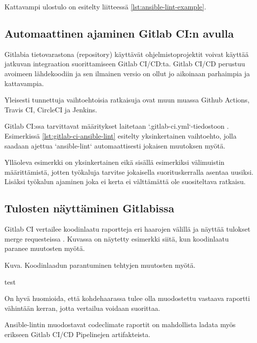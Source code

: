 Kattavampi ulostulo on esitelty liitteessä \ref{lst:ansible-lint-example}.

\subsection{Automaattinen ajaminen Gitlab CI:n avulla}

Gitlabia tietovarastona (repository) käyttävät ohjelmistoprojektit voivat käyttää
jatkuvan integraation suorittamiseen Gitlab CI/CD:ta. Gitlab CI/CD perustuu
avoimeen lähdekoodiin ja sen ilmainen versio on ollut jo aikoinaan parhaimpia ja
kattavampia. \parencite{alma9911268330505973}

Yleisesti tunnettuja vaihtoehtoisia ratkaisuja ovat muun muassa Github Actions,
Travis CI, CircleCI ja Jenkins.

Gitlab CI:ssa tarvittavat määritykset laitetaan `.gitlab-ci.yml`-tiedostoon
\parencite{GitlabCICDDocs}. Esimerkissä \ref{lst:gitlab-ci-ansible-lint} esitelty
yksinkertainen vaihtoehto, jolla saadaan ajettua `ansible-lint` automaattisesti
jokaisen muutoksen myötä.



Ylläoleva esimerkki on yksinkertainen eikä sisällä esimerkiksi välimuistin
määrittämistä, jotten työkaluja tarvitse jokaisella suorituskerralla asentaa
uusiksi. Lisäksi työkalun ajaminen joka ei kerta ei välttämättä ole suositeltava
ratkaisu.

\subsection{Tulosten näyttäminen Gitlabissa}

Gitlab CI vertailee koodinlaatu raportteja eri haarojen välillä ja näyttää
tulokset merge requesteissa \parencite{GitlabCICDDocs}. Kuvassa on
näytetty esimerkki siitä, kun koodinlaatu paranee muutosten myötä.

{Kuva. Koodinlaadun parantuminen tehtyjen muutosten myötä.}
\caption{test}

On hyvä huomioida, että kohdehaarassa tulee olla muodostettu vastaava
raportti vähintään kerran, jotta vertailua voidaan suorittaa. \parencite{GitlabCICDDocs}

Ansible-lintin muodostavat codeclimate raportit on mahdollista ladata myös
erikseen Gitlab CI/CD Pipelinejen artifakteista. \parencite{GitlabCICDDocs}
